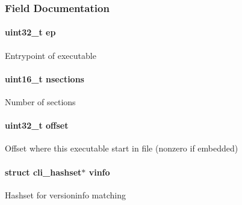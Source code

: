 \subsubsection{Field Documentation}
\hypertarget{structcli__exe__info_afaed4671662028c061ab84eefcce0546}{
\paragraph[{ep}]{\setlength{\rightskip}{0pt plus 5cm}uint32\_\-t {\bf ep}}\hfill}
\label{structcli__exe__info_afaed4671662028c061ab84eefcce0546}
Entrypoint of executable \hypertarget{structcli__exe__info_aa4af5e526457df524fc9a4ba46803a70}{
\paragraph[{nsections}]{\setlength{\rightskip}{0pt plus 5cm}uint16\_\-t {\bf nsections}}\hfill}
\label{structcli__exe__info_aa4af5e526457df524fc9a4ba46803a70}
Number of sections \hypertarget{structcli__exe__info_a894bdfa2d603d8343f8ef01dda6fcd23}{
\paragraph[{offset}]{\setlength{\rightskip}{0pt plus 5cm}uint32\_\-t {\bf offset}}\hfill}
\label{structcli__exe__info_a894bdfa2d603d8343f8ef01dda6fcd23}
Offset where this executable start in file (nonzero if embedded) \hypertarget{structcli__exe__info_a45edc7cf7855a99b33ce31a17c6bdfc6}{
\paragraph[{vinfo}]{\setlength{\rightskip}{0pt plus 5cm}struct cli\_\-hashset$\ast$ {\bf vinfo}}\hfill}
\label{structcli__exe__info_a45edc7cf7855a99b33ce31a17c6bdfc6}
Hashset for versioninfo matching 
